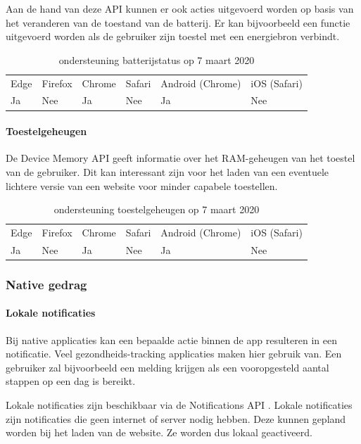 	Aan de hand van deze API kunnen er ook acties uitgevoerd worden op basis van het veranderen van de toestand van de batterij. Er kan bijvoorbeeld een functie uitgevoerd worden als de gebruiker zijn toestel met een energiebron verbindt.
	
	\begin{table}[H]
		\centering
		\begin{tabular}{llllll}
			Edge & Firefox & Chrome & Safari & Android (Chrome) & iOS (Safari) \\
			Ja   & Nee      &  Ja     & Nee     & Ja               & Nee          
		\end{tabular}	
		\caption{ondersteuning batterijstatus op 7 maart 2020 }
	\end{table}
	
	\paragraph{Toestelgeheugen}
	De Device Memory API \autocite{Panicker2018} geeft informatie over het RAM-geheugen van het toestel van de gebruiker. Dit kan interessant zijn voor het laden van een eventuele lichtere versie van een website voor minder capabele toestellen.
	
	\begin{table}[H]
		\centering
		\begin{tabular}{llllll}
			Edge & Firefox & Chrome & Safari & Android (Chrome) & iOS (Safari) \\
			Ja   & Nee      &  Ja     & Nee     & Ja               & Nee          
		\end{tabular}	
		\caption{ondersteuning toestelgeheugen op 7 maart 2020}
	\end{table}
	
	
	
	\subsubsection{Native gedrag}
	
	\paragraph{Lokale notificaties}
	Bij native applicaties kan een bepaalde actie binnen de app resulteren in een notificatie. Veel gezondheids-tracking applicaties maken hier gebruik van. Een gebruiker zal bijvoorbeeld een melding krijgen als een vooropgesteld aantal stappen op een dag is bereikt.
	
	Lokale notificaties zijn beschikbaar via de Notifications API \autocite{Gregg2015}. Lokale notificaties zijn notificaties die geen internet of server nodig hebben. Deze kunnen gepland worden bij het laden van de website. Ze worden dus lokaal geactiveerd.
	
